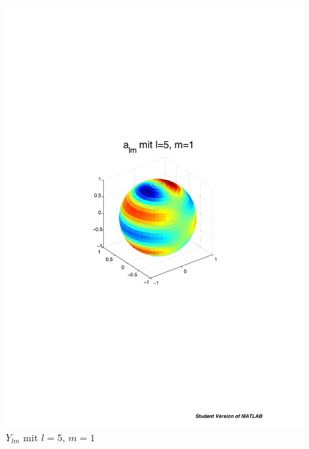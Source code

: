 \begin{refsection}
\begin{figure}
\begin{minipage}[hbt]{0.4\textwidth}
\includegraphics[width=1\textwidth]{kugel/ylm/a_5_1.pdf}
\caption{$Y_{lm}$ mit $l=5$, $m=1$}
\label{skript:ylm l=5 m=1}
\end{minipage}
\hfill
\begin{minipage}[hbt]{0.4\textwidth}
\centering

\end{minipage}
\end{figure}
\end{refsection}
